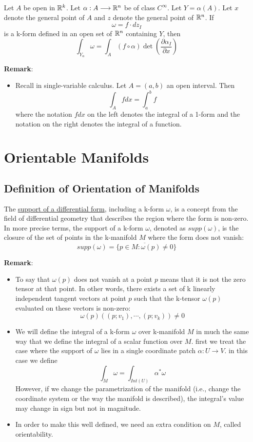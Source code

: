 \begin{theorem}
    Let $A$ be open in $\mathbb{R}^k$. Let $\alpha:A\longrightarrow\mathbb{R}^n$ be of class $C^{\infty}$. 
    Let $Y=\alpha(A)$. Let $x$ denote the general point of $A$ and $z$ denote the general point of $\mathbb{R}^n$. If $$\omega=f\cdot dz_I$$
    is a k-form defined in an open set of $\mathbb{R}^n$ containing $Y$, then $$\int_{Y_{\alpha}}\omega=\int_A(f\circ \alpha)\det(\frac{\partial \alpha_I}{\partial x})$$
\end{theorem}

\noindent\textbf{Remark}:
\begin{itemize}
    \item Recall in single-variable calculus. Let $A=(a,b)$ an open interval. Then $$\int_Afdx=\int_a^bf$$
    where the notation $fdx$ on the left denotes the integral of a 1-form and the notation on the right denotes the integral of a function.
\end{itemize}

\section{Orientable Manifolds}

\subsection{Definition of Orientation of Manifolds}

\begin{definition}
    The \underline{support of a differential form}, including a k-form $\omega$, is a concept from the field of differential geometry that describes the region where the form is non-zero. In more precise terms, the support of a k-form $\omega$, denoted as $supp(\omega)$, is the closure of the set of points in the k-manifold $M$ where the form does not vanish:
    $$supp(\omega)=\overline{\{p\in M: \omega(p)\neq 0}\}$$
\end{definition}

\noindent\textbf{Remark}:
\begin{itemize}
    \item To say that $\omega(p)$ does not vanish at a point $p$ means that it is not the zero tensor at that point. In other words, there exists a set of k linearly independent tangent vectors at point $p$ such that the k-tensor $\omega(p)$ evaluated on these vectors is non-zero:
    $$\omega(p)((p;v_1),\cdots,(p;v_k))\neq 0$$
    \item We will define the integral of a k-form $\omega$ over k-manifold $M$ in much the same way that we define the integral of a scalar function over $M$. first we treat the case where the support of $\omega$ lies in a single coordinate patch $\alpha:U\longrightarrow V$. in this case we define
    $$\int_M\omega=\int_{Int(U)}\alpha^*\omega$$
    However, if we change the parametrization of the manifold (i.e., change the coordinate system or the way the manifold is described), the integral's value may change in sign but not in magnitude.
    \item In order to make this well defined, we need an extra condition on $M$, called orientability.
\end{itemize}

